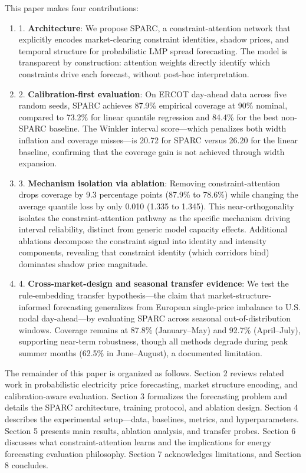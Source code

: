 \documentclass[twoside]{article}
\begin{document}
This paper makes four contributions:
\begin{enumerate}
  \item 1. \textbf{Architecture}: We propose SPARC, a constraint-attention network that explicitly encodes market-clearing constraint identities, shadow prices, and temporal structure for probabilistic LMP spread forecasting. The model is transparent by construction: attention weights directly identify which constraints drive each forecast, without post-hoc interpretation.
  \item 2. \textbf{Calibration-first evaluation}: On ERCOT day-ahead data across five random seeds, SPARC achieves 87.9\% empirical coverage at 90\% nominal, compared to 73.2\% for linear quantile regression and 84.4\% for the best non-SPARC baseline. The Winkler interval score---which penalizes both width inflation and coverage misses---is 20.72 for SPARC versus 26.20 for the linear baseline, confirming that the coverage gain is not achieved through width expansion.
  \item 3. \textbf{Mechanism isolation via ablation}: Removing constraint-attention drops coverage by 9.3 percentage points (87.9\% to 78.6\%) while changing the average quantile loss by only 0.010 (1.335 to 1.345). This near-orthogonality isolates the constraint-attention pathway as the specific mechanism driving interval reliability, distinct from generic model capacity effects. Additional ablations decompose the constraint signal into identity and intensity components, revealing that constraint identity (which corridors bind) dominates shadow price magnitude.
  \item 4. \textbf{Cross-market-design and seasonal transfer evidence}: We test the rule-embedding transfer hypothesis---the claim that market-structure-informed forecasting generalizes from European single-price imbalance to U.S. nodal day-ahead---by evaluating SPARC across seasonal out-of-distribution windows. Coverage remains at 87.8\% (January--May) and 92.7\% (April--July), supporting near-term robustness, though all methods degrade during peak summer months (62.5\% in June--August), a documented limitation.
\end{enumerate}
The remainder of this paper is organized as follows. Section 2 reviews related work in probabilistic electricity price forecasting, market structure encoding, and calibration-aware evaluation. Section 3 formalizes the forecasting problem and details the SPARC architecture, training protocol, and ablation design. Section 4 describes the experimental setup---data, baselines, metrics, and hyperparameters. Section 5 presents main results, ablation analysis, and transfer probes. Section 6 discusses what constraint-attention learns and the implications for energy forecasting evaluation philosophy. Section 7 acknowledges limitations, and Section 8 concludes.
\end{document}
